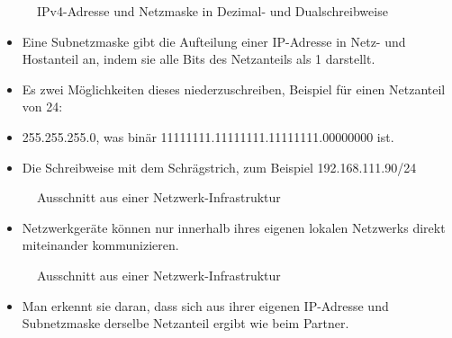 \begin{frame}
\begin{figure}
    \caption{\scriptsize IPv4-Adresse und Netzmaske in Dezimal- und Dualschreibweise}
    \label{netzmaske}
\end{figure}

\begin{itemize}
  \item Eine Subnetzmaske gibt die Aufteilung einer IP-Adresse in Netz- und Hostanteil an, indem sie alle Bits des Netzanteils als 1 darstellt.
  \end{itemize}
\end{frame}

\begin{frame}\begin{itemize}
  \item Es zwei Möglichkeiten dieses niederzuschreiben, Beispiel für einen Netzanteil von 24:
  \item 255.255.255.0, was binär 11111111.11111111.11111111.00000000 ist.
  \item Die Schreibweise mit dem Schrägstrich, zum Beispiel 192.168.111.90/24
  \end{itemize}

\end{frame}

\begin{frame}
\begin{figure}
    \caption{\scriptsize Ausschnitt aus einer Netzwerk-Infrastruktur}
    \label{netzwerk}
\end{figure}

\begin{itemize}
  \item Netzwerkgeräte können nur innerhalb ihres eigenen lokalen Netzwerks direkt miteinander kommunizieren.
  \end{itemize}
\end{frame}

\begin{frame}
\begin{figure}
    \caption{\scriptsize Ausschnitt aus einer Netzwerk-Infrastruktur}
    \label{netzwerk}
\end{figure}

\begin{itemize}
  \item Man erkennt sie daran, dass sich aus ihrer eigenen IP-Adresse und Subnetzmaske derselbe Netzanteil ergibt wie beim Partner.
  \end{itemize}
\end{frame}

